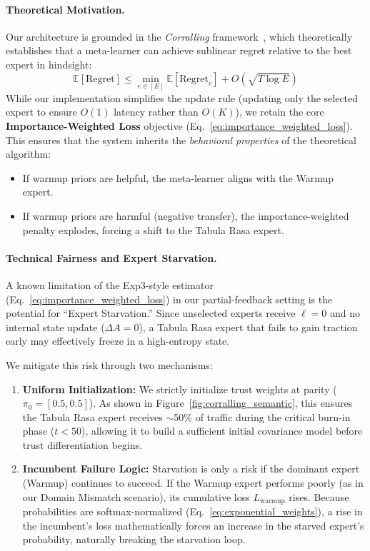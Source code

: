 \paragraph{Theoretical Motivation.}
Our architecture is grounded in the \emph{Corralling} framework~\cite{agarwal2017corralling}, which theoretically establishes that a meta-learner can achieve sublinear regret relative to the best expert in hindsight:
\begin{equation}
\mathbb{E}[\text{Regret}] \leq \min_{e \in [E]} \mathbb{E}[\text{Regret}_e] + O\left(\sqrt{T \log E}\right)
\end{equation}
While our implementation simplifies the update rule (updating only the selected expert to ensure $O(1)$ latency rather than $O(K)$), we retain the core \textbf{Importance-Weighted Loss} objective (Eq.~\ref{eq:importance_weighted_loss}).
This ensures that the system inherits the \emph{behavioral properties} of the theoretical algorithm:
\begin{itemize}[nosep]
    \item If warmup priors are helpful, the meta-learner aligns with the Warmup expert.
    \item If warmup priors are harmful (negative transfer), the importance-weighted penalty explodes, forcing a shift to the Tabula Rasa expert.
\end{itemize}

\paragraph{Technical Fairness and Expert Starvation.}
A known limitation of the Exp3-style estimator (Eq.~\ref{eq:importance_weighted_loss}) in our partial-feedback setting is the potential for ``Expert Starvation.'' Since unselected experts receive $\ell=0$ and no internal state update ($\Delta A = 0$), a Tabula Rasa expert that fails to gain traction early may effectively freeze in a high-entropy state.

We mitigate this risk through two mechanisms:
\begin{enumerate}[nosep]
    \item \textbf{Uniform Initialization:} We strictly initialize trust weights at parity ($\pi_0 = [0.5, 0.5]$). As shown in Figure~\ref{fig:corralling_semantic}, this ensures the Tabula Rasa expert receives $\sim$50\% of traffic during the critical burn-in phase ($t < 50$), allowing it to build a sufficient initial covariance model before trust differentiation begins.
    \item \textbf{Incumbent Failure Logic:} Starvation is only a risk if the dominant expert (Warmup) continues to succeed. If the Warmup expert performs poorly (as in our Domain Mismatch scenario), its cumulative loss $L_{\text{warmup}}$ rises. Because probabilities are softmax-normalized (Eq.~\ref{eq:exponential_weights}), a rise in the incumbent's loss mathematically forces an increase in the starved expert's probability, naturally breaking the starvation loop.
\end{enumerate}

